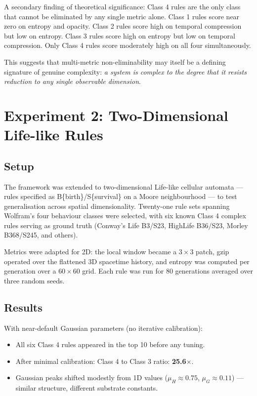 \documentclass[12pt,a4paper]{article}
\begin{document}
A secondary finding of theoretical significance: Class 4 rules are the
only class that cannot be eliminated by any single metric alone.
Class 1 rules score near zero on entropy and opacity.
Class 2 rules score high on temporal compression but low on entropy.
Class 3 rules score high on entropy but low on temporal compression.
Only Class 4 rules score moderately high on all four simultaneously.

This suggests that multi-metric non-eliminability may itself be a
defining signature of genuine complexity: \emph{a system is complex
to the degree that it resists reduction to any single observable dimension}.

\section{Experiment 2: Two-Dimensional Life-like Rules}

\subsection{Setup}

The framework was extended to two-dimensional Life-like cellular
automata — rules specified as B\{birth\}/S\{survival\} on a Moore
neighbourhood — to test generalisation across spatial dimensionality.
Twenty-one rule sets spanning Wolfram's four behaviour classes were
selected, with six known Class 4 complex rules serving as ground truth
(Conway's Life B3/S23, HighLife B36/S23, Morley B368/S245, and others).

Metrics were adapted for 2D: the local window became a $3 \times 3$
patch, gzip operated over the flattened 3D spacetime history,
and entropy was computed per generation over a $60 \times 60$ grid.
Each rule was run for 80 generations averaged over three random seeds.

\subsection{Results}

With near-default Gaussian parameters (no iterative calibration):

\begin{itemize}[noitemsep]
  \item All six Class 4 rules appeared in the top 10 before any tuning.
  \item After minimal calibration: Class 4 to Class 3 ratio: \textbf{25.6$\times$}.
  \item Gaussian peaks shifted modestly from 1D values
        ($\mu_H \approx 0.75$, $\mu_G \approx 0.11$) — similar structure,
        different substrate constants.
\end{itemize}
\end{document}

